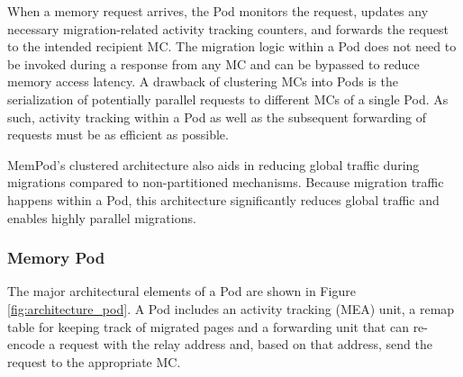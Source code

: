 When a memory request arrives, the Pod monitors the request, updates any 
necessary migration-related activity tracking counters, and forwards 
the request to the intended recipient MC. The migration logic within a Pod does not need to be invoked during a response from any MC and can be bypassed to reduce memory access latency. A drawback of clustering MCs into Pods is the serialization of potentially parallel requests to different MCs of a single Pod. As such, activity tracking within a Pod as well as the subsequent forwarding of requests must be as efficient as possible. 

MemPod's clustered architecture also aids in reducing global traffic during migrations compared to non-partitioned mechanisms.  Because migration
traffic happens within a Pod, this architecture significantly reduces global
traffic and enables highly parallel migrations.

\subsubsection*{Memory Pod}

The major architectural elements of a Pod are shown in Figure \ref{fig:architecture_pod}. A Pod includes an activity tracking (MEA) unit, a remap table for keeping track of migrated pages and a forwarding unit that can re-encode a request with the relay address and, based on that address, send the request to the appropriate MC.
%

